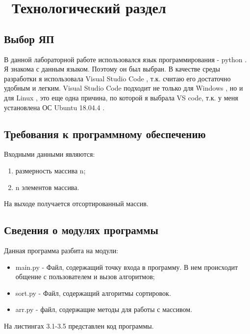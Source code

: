 \chapter{ Технологический раздел}
\label{cha:design}

\section{Выбор ЯП}

В данной лабораторной работе использовался язык программирования - python \cite{bib1}.
Я знакома с данным языком.
Поэтому он был выбран. 
В качестве среды разработки я использовала Visual Studio Code \cite{bib2}, т.к. считаю его достаточно удобным и легким.
Visual Studio Code подходит не только для  Windows \cite{bib3}, но и для Linux \cite{bib4}, это еще одна причина, по которой я выбрала VS code, т.к. у меня установлена ОС Ubuntu 18.04.4 \cite{bib5}.

\section{Требования к программному обеспечению}

Входными данными являются:


\begin{enumerate}
    \item размерность массива n;
    \item n элементов массива.
\end{enumerate}

На выходе получается отсортированный массив.

\section{Сведения о модулях программы}

Данная программа разбита на модули:

\begin{itemize}
    \item main.py - Файл, содержащий точку входа в программу. В нем происходит общение с пользователем и вызов алгоритмов;
    \item sort.py - Файл, содержащий алгоритмы сортировок.
    \item arr.py - файл, содержащие методы для работы с массивом.
\end{itemize}

На листингах 3.1-3.5 представлен код программы.

